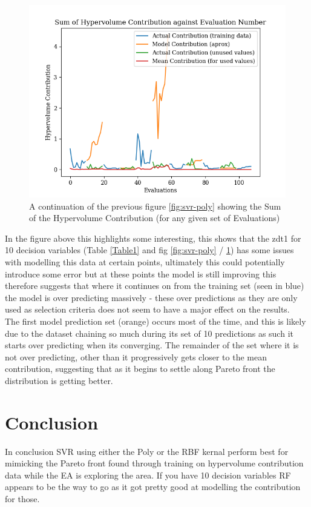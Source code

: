 \documentclass[sigconf,review,nonacm]{acmart}
\begin{document}
\begin{figure}[H]
    \centering
    \includegraphics[width=0.7\linewidth]{Images/Figure_1_SVRPoly_ZDT1_10_graph.png}
    \caption{A continuation of the previous figure \ref{fig:svr-poly} showing the Sum of the Hypervolume Contribution (for any given set of Evaluations)}
    \label{fig:SVR-2}
\end{figure}

In the figure above this highlights some interesting, this shows that the zdt1 for 10 decision variables (Table \ref{Table1} and fig \ref{fig:svr-poly} / \ref{fig:SVR-2}) has some issues with modelling this data at certain points, ultimately this could potentially introduce some error but at these points the model is still improving this therefore suggests that where it continues on from the training set (seen in blue) the model is over predicting massively - these over predictions as they are only used as selection criteria does not seem to have a major effect on the results.  \\ 

The first model prediction set (orange) occurs most of the time, and this is likely due to the dataset chaining so much during its set of 10 predictions as such it starts over predicting when its converging. The remainder of the set where it is not over predicting, other than it progressively gets closer to the mean contribution, suggesting that as it begins to settle along Pareto front the distribution is getting better. \\ 

\section{Conclusion}

In conclusion SVR using either the Poly or the RBF kernal perform best for mimicking the Pareto front found through training on hypervolume contribution data while the EA is exploring the area. If you have 10 decision variables RF appears to be the way to go as it got pretty good at modelling the contribution for those. \\
\end{document}

